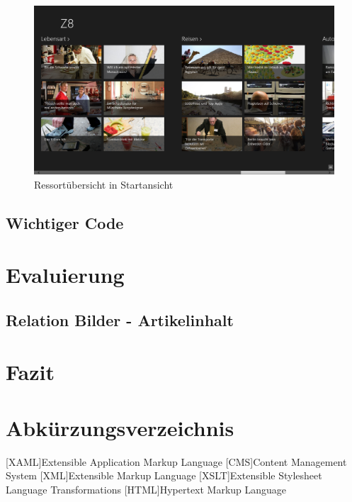 \documentclass[12pt,a4paper]{scrartcl}
\begin{document}
\begin{figure}[h]
	\centering
	\includegraphics[width=\textwidth]{Bilder/Screenshots/app/reise_aegypten_2gmit.png} 
	\caption{Ressortübersicht in Startansicht}
\end{figure}


\subsection{Wichtiger Code}
\label{subsec:wichtigercode}



\newpage
\section{Evaluierung} 
\label{sec:evaluierung}
\subsection{Relation Bilder - Artikelinhalt}
\label{subsec:rel_bilder_artikel} 

\newpage
\section{Fazit}
\label{sec:fazit}

\newpage
\section*{Abkürzungsverzeichnis}
\label{sec:abkürzungen}
\begin{acronym}[SEPSEP]
	[XAML]{Extensible Application Markup Language}
	 [CMS]{Content Management System}
	 [XML]{Extensible Markup Language}
	[XSLT]{Extensible Stylesheet Language Transformations}
	[HTML]{Hypertext Markup Language}
\end{acronym}

\newpage
\begin{singlespace}
	
	
\end{singlespace}

\newpage
\listoffigures
\end{document}
